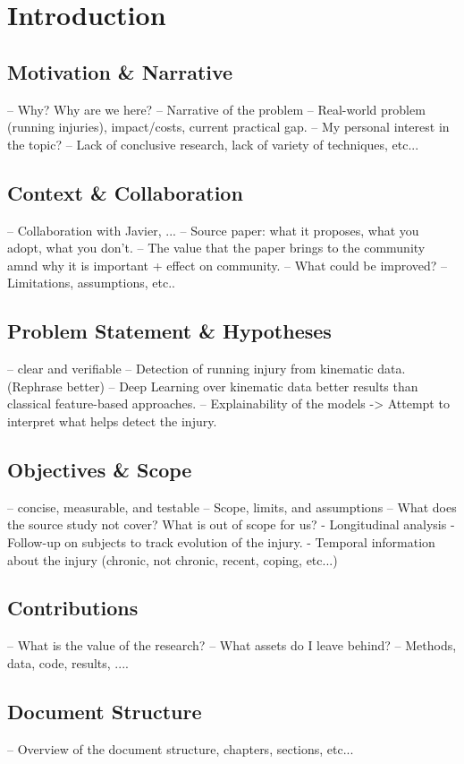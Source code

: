 \chapter{Introduction}\label{chap:introduction}

\section{Motivation \& Narrative}\label{sec:intro-motivation}
-- Why? Why are we here?
-- Narrative of the problem
-- Real-world problem (running injuries), impact/costs, current practical gap.
-- My personal interest in the topic?
-- Lack of conclusive research, lack of variety of techniques, etc...

\section{Context \& Collaboration}\label{sec:intro-context}
-- Collaboration with Javier, ...
-- Source paper: what it proposes, what you adopt, what you don't.
    -- The value that the paper brings to the community amnd why it is important + effect on community.
    -- What could be improved?
    -- Limitations, assumptions, etc..

\section{Problem Statement \& Hypotheses}\label{sec:intro-problem-hypotheses}
-- clear and verifiable
-- Detection of running injury from kinematic data. (Rephrase better)
-- Deep Learning over kinematic data better results than classical feature-based approaches.
-- Explainability of the models -> Attempt to interpret what helps detect the injury.

\section{Objectives \& Scope}\label{sec:intro-objectives-scope}
-- concise, measurable, and testable
-- Scope, limits, and assumptions
-- What does the source study not cover? What is out of scope for us?
    - Longitudinal analysis
    - Follow-up on subjects to track evolution of the injury.
    - Temporal information about the injury (chronic, not chronic, recent, coping, etc...)

\section{Contributions}\label{sec:intro-contributions}
-- What is the value of the research?
-- What assets do I leave behind?
-- Methods, data, code, results, ....

\section{Document Structure}\label{sec:intro-structure}
-- Overview of the document structure, chapters, sections, etc...
